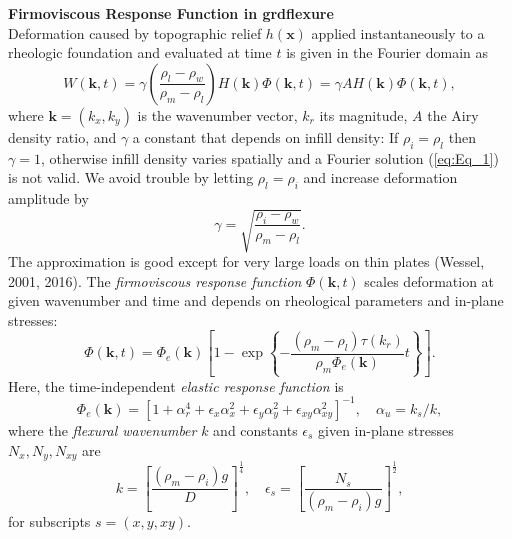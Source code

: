 \documentclass[12pt]{article}
\begin{document}

{\center \bf Firmoviscous Response Function in grdflexure}\\

Deformation caused by topographic relief $h(\mathbf{x})$ applied instantaneously to a
rheologic foundation and evaluated at time $t$ is given in the Fourier domain as
\begin{equation}
W(\mathbf{k},t) = \gamma \left (\frac{\rho_l - \rho_w}{\rho_m - \rho_l} \right ) H(\mathbf{k}) \Phi(\mathbf{k},t) = \gamma A H(\mathbf{k}) \Phi(\mathbf{k},t),
\label{eq:Eq_1}
\end{equation}
where $\mathbf{k} = (k_x, k_y)$ is the wavenumber vector, $k_r$ its magnitude, $A$ the Airy density ratio,
and $\gamma$ a constant that depends on infill density: If $\rho_i = \rho_l$ then $\gamma = 1$,
otherwise infill density varies spatially and a Fourier solution (\ref{eq:Eq_1}) is not valid.
We avoid trouble by letting $\rho_l = \rho_i$ and increase deformation amplitude by
\begin{equation}
\gamma = \sqrt{\frac{\rho_i - \rho_w}{\rho_m - \rho_l}}.
\label{eq:Eq_3}
\end{equation}
The approximation is good except for very large loads on thin plates (Wessel, 2001, 2016).
The {\it firmoviscous response function} $\Phi(\mathbf{k},t)$ scales deformation at given wavenumber and time
and depends on rheological parameters and in-plane stresses:
\begin{equation}
\Phi(\mathbf{k},t) = \Phi_e(\mathbf{k}) \left [ 1 - \exp \left \{ - \frac{(\rho_m - \rho_l) \tau(k_r)}{\rho_m\Phi_e(\mathbf{k})} t \right \} \right ].
\end{equation}
Here, the time-independent {\it elastic response function} is
\begin{equation}
\Phi_e(\mathbf{k}) = \left [ 1 + \alpha_r^4 + \epsilon_x \alpha_x^2 + \epsilon_y \alpha_y^2 + \epsilon_{xy} \alpha_{xy}^2 \right ]^{-1}, \quad \alpha_u = k_s / k,
\label{eq:Eq_5}
\end{equation}
where the {\it flexural wavenumber} $k$ and constants $\epsilon_s$ given in-plane stresses $N_x, N_y, N_{xy}$ are
\begin{equation}
k = \left [ \frac{(\rho_m - \rho_i)g}{D} \right ]^{\frac{1}{4}}, \quad \epsilon_s = \left [ \frac{N_s}{(\rho_m - \rho_i)g} \right ]^{\frac{1}{2}},
\label{eq:Eq_7}
\end{equation}
for subscripts $s = \left (x, y, xy \right )$.
\end{document}
